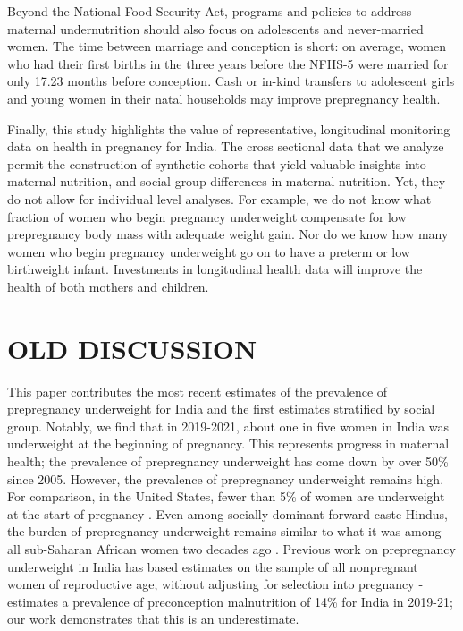 Beyond the National Food Security Act, programs and policies to address maternal undernutrition should also focus on adolescents and never-married women.  The time  between marriage and conception is short: on average, women who had their first births in the three years before the NFHS-5 were married for only 17.23 months before conception.  Cash or in-kind transfers to adolescent girls and young women in their natal households may improve prepregnancy health.  

Finally, this study highlights the value of representative, longitudinal monitoring data on health in pregnancy for India.  The cross sectional data that we analyze permit the construction of synthetic cohorts that yield valuable insights into maternal nutrition, and social group differences in maternal nutrition.  Yet, they do not allow for individual level analyses.  For example, we do not know what fraction of women who begin pregnancy underweight compensate for low prepregnancy body mass with adequate weight gain.  Nor do we know how many women who begin pregnancy underweight go on to have a preterm or low birthweight infant.  Investments in longitudinal health data will improve the health of both mothers and children.

\section{OLD DISCUSSION}

This paper contributes the most recent estimates of the prevalence of prepregnancy underweight for India and the first estimates stratified by social group. Notably, we find that in 2019-2021, about one in five women in India was underweight at the beginning of pregnancy. This represents progress in maternal health; the prevalence of prepregnancy underweight has come down by over 50\% since 2005.  However, the prevalence of prepregnancy underweight remains high.  For comparison, in the United States, fewer than 5\% of women are underweight at the start of pregnancy \citep{zong2022maternal}. Even among socially dominant forward caste Hindus, the burden of prepregnancy underweight remains similar to what it was among all sub-Saharan African women two decades ago \citep{coffey2015prepregnancy}. Previous work on prepregnancy underweight in India has based estimates on the sample of all nonpregnant women of reproductive age, without adjusting for selection into pregnancy -  \cite{miller2025preconception} estimates a prevalence of preconception malnutrition of 14\% for India in 2019-21; our work demonstrates that this is an underestimate. 

